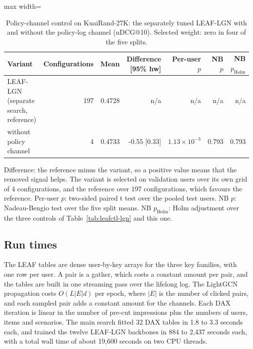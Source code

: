 \documentclass[preprint,12pt,authoryear]{elsarticle}
\begin{document}
\begin{table}[tbp]
\centering
\footnotesize
\caption{Policy-channel control on KuaiRand-27K: the separately tuned LEAF-LGN with and without the policy-log channel (nDCG@10). Selected weight: zero in four of the five splits.}
\label{tab:policy}
\begin{adjustbox}{max width=\linewidth}
\begin{tabular}{lrrrrrr}
\toprule
Variant & Configurations & Mean & Difference [95\% hw] & Per-user $p$ & NB $p$ & NB $p_{\mathrm{Holm}}$ \\
\midrule
LEAF-LGN (separate search, reference) & 197 & 0.4728 & n/a & n/a & n/a & n/a \\
\midrule
without policy channel & 4 & 0.4733 & -0.55 [0.33] & $1.13\times10^{-3}$ & 0.793 & 0.793 \\
\bottomrule
\end{tabular}
\end{adjustbox}
\par\smallskip
\begin{minipage}{\linewidth}\raggedright\footnotesize Difference: the reference minus the variant, so a positive value means that the removed signal helps. The variant is selected on validation users over its own grid of 4 configurations, and the reference over 197 configurations, which favours the reference. Per-user $p$: two-sided paired t test over the pooled test users. NB $p$: Nadeau-Bengio test over the five split means. NB $p_{\mathrm{Holm}}$: Holm adjustment over the three controls of Table~\ref{tab:leafctl-lgn} and this one.\end{minipage}
\end{table}


\subsection{Run times}\label{app:cost}

The LEAF tables are dense user-by-key arrays for the three key families, with one row per user. A pair is a gather, which costs a constant amount per
pair, and the tables are built in one streaming pass over the lifelong log. The LightGCN propagation costs $O(L|E|d)$ per epoch, where $|E|$ is the number
of clicked pairs, and each sampled pair adds a constant amount for the channels. Each DAX iteration is linear in the number of pre-cut impressions plus
the numbers of users, items and scenarios. The main search fitted 32 DAX tables in 1.8 to 3.3 seconds each, and trained the twelve LEAF-LGN backbones in 884
to 2,437 seconds each, with a total wall time of about 19,600 seconds on two CPU threads.
\end{document}

